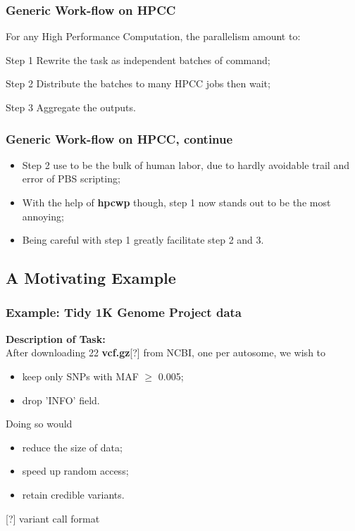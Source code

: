 \documentclass{beamer}
\begin{document}


\begin{frame}
\frametitle{Generic Work-flow on HPCC}
For any High Performance Computation, the parallelism amount to:
\begin{block}{Step 1}
Rewrite the task as independent batches of command;
\end{block}

\begin{block}{Step 2}
Distribute the batches to many HPCC jobs then wait;
\end{block}

\begin{block}{Step 3}
Aggregate the outputs.
\end{block}
\end{frame}


\begin{frame}
\frametitle{Generic Work-flow on HPCC, continue}
\begin{itemize}
\item Step 2 use to be the bulk of human labor, due to hardly avoidable trail and error of PBS scripting;
\item With the help of \textbf{hpcwp} though, step 1 now stands out to be the most annoying;
\item Being careful with step 1 greatly facilitate step 2 and 3.
\end{itemize}

\end{frame}

\subsection{A Motivating Example}
\begin{frame}
\frametitle{Example: Tidy 1K Genome Project data}

\textbf{Description of Task:} \\
After downloading 22 \textbf{vcf.gz}[?] from NCBI, one per autosome, we wish to
\begin{itemize}
\item keep only SNPs with MAF \(\ge\) 0.005;
\item drop 'INFO' field.
\end{itemize}
Doing so would
\begin{itemize}
\item reduce the size of data;
\item speed up random access;
\item retain credible variants.
\end{itemize}
\small [?] variant call format
\end{frame}
\end{document}
